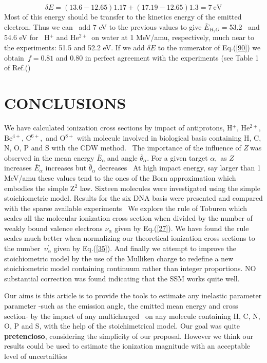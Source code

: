 \documentclass[preprint,12pt]{article}
\begin{document}
\begin{equation}
\delta E=(13.6-12.65)1.17+(17.19-12.65)1.3=7\ \text{eV}  \label{80}
\end{equation}%
Most of this energy should be transfer to the kinetics energy of the emitted
electron. Thus we can \ add 7 eV to the previous values to give $\overline{E}%
_{H_{2}O}=$53.2 \ and 54.6 eV for \ H$^{+}$ and He$^{2+~}$ on water at 1
MeV/amu, respectively, much near to the experiments: 51.5 and 52.2 eV. If we
add $\delta E$ to the numerator of Eq.(\ref{90}) we obtain\ $f=0.81$ and $%
0.80$ in perfect agreement with the experiments (see Table 1 of Ref.(\cite%
{pimblott2007})

\section{CONCLUSIONS}

We have calculated ionization cross sections by impact of antiprotons, H$^{+}
$, He$^{2+}$, Be$^{4+}$, C$^{6+}$,\ and O$^{8+}$ with molecule involved in
biological basis containing H, C, N, O, P and S with the CDW method. \ The
importance of the influence of $Z\ $was observed in the mean energy $%
\overline{E}_{\alpha }\ $and angle $\overline{\theta }_{\alpha }.$ For a
given target $\alpha ,$ as $Z$ increases $\overline{E}_{\alpha }$ increases
but $\overline{\theta }_{\alpha }$ decreases \ At high impact energy, say
larger than 1 MeV/amu these values tend to the ones of the Born
approximation which embodies the simple Z$^{2}$ law. Sixteen molecules were
investigated using the simple stoichiometric model. Results for the six DNA
basis were presented and compared with the sparse available experiments \ We
explore the rule of Toburen which scales all the molecular ionization cross
section when divided by the number of weakly bound valence electrons $\nu
_{\alpha }$ given by Eq.(\ref{27})$.$ We have found the rule scales much
better when normalizing our theoretical ionization cross sections to the
number\ $\upsilon _{\alpha }^{\prime }$ given by Eq.(\ref{35}). And finally
we attempt to improve the stoichiometric model by the use of the Mulliken
charge to redefine a new stoichiometric model containing continuum rather
than integer proportions. NO substantial correction was found indicating
that the SSM works quite well.

Our aims is this article is to provide the tools to estimate any inelastic
parameter parameter -such as the emission angle, the emitted mean energy and
cross section- by the impact of any multicharged \ on any molecule
containing H, C, N, O, P and S, with the help of the stoichimetrical model.
Our goal was quite \textbf{pretencioso}, considering the simplicity of our
proposal. However we think our results could be used to estimate the
ionization magnitude with an acceptable level of uncertailties
\end{document}
